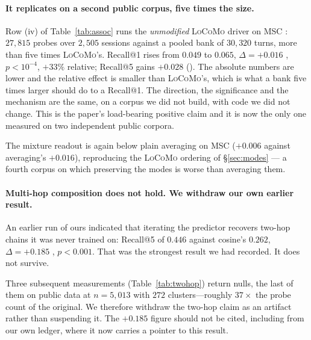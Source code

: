 \paragraph{It replicates on a second public corpus, five times the size.} Row (iv) of
Table~\ref{tab:assoc} runs the \emph{unmodified} \textsc{LoCoMo} driver on \textsc{MSC}
\citep{xu2022msc}: $27{,}815$ probes over $2{,}505$ sessions against a pooled bank of
$30{,}320$ turns, more than five times \textsc{LoCoMo}'s. Recall@1 rises from $0.049$ to
$0.065$, $\Delta = +0.016$ , $p<10^{-4}$, $+33\%$ relative; Recall@5
gains $+0.028$  (). The absolute numbers are lower and the
relative effect is smaller than \textsc{LoCoMo}'s, which is what a bank five times larger
should do to a Recall@1. The direction, the significance and the mechanism are the same, on
a corpus we did not build, with code we did not change. This is the paper's load-bearing
positive claim and it is now the only one measured on two independent public corpora.

The mixture readout is again below plain averaging on \textsc{MSC} ($+0.006$ against
averaging's $+0.016$), reproducing the \textsc{LoCoMo} ordering of \S\ref{sec:modes} --- a
fourth corpus on which preserving the modes is worse than averaging them.

\paragraph{Multi-hop composition does not hold. We withdraw our own earlier result.}
An earlier run of ours indicated that iterating the predictor recovers two-hop chains it was
never trained on: Recall@5 of $0.446$ against cosine's $0.262$, $\Delta = +0.185$
, $p<0.001$. That was the strongest result we had recorded. It does not
survive.

Three subsequent measurements (Table~\ref{tab:twohop}) return nulls, the last of them on
public data at $n{=}5{,}013$ with $272$ clusters---roughly $37\times$ the probe count of the
original. We therefore withdraw the two-hop claim as an artifact rather than suspending it.
The $+0.185$ figure should not be cited, including from our own ledger, where it now carries
a pointer to this result.

\begin{table}[t]\centering\small
\caption{Two-hop composition, every measurement we have. The original script was lost before
it was committed, so (a) cannot be re-run; (b), (c) and (d) are independent
reimplementations under storyline- and session-disjoint rotation. Row (c) is $p{=}0.77$.
Row (d) excludes zero at $n{=}25{,}310$ but at $1/18$ the magnitude of the withdrawn
$+0.185$; the original claim is withdrawn and the surviving effect is too small to build on.}
\label{tab:twohop}

\end{table}

